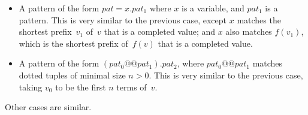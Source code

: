 \begin{itemize}
\item A pattern of the form $pat = x.pat_1$ where $x$ is a variable, and
  $pat_1$ is a pattern.  This is very similar to the previous case, except $x$
  matches the shortest prefix~$v_1$ of~$v$ that is a completed value; and $x$
  also matches $f(v_1)$, which is the shortest prefix of~$f(v)$ that is a
  completed value.

\item A pattern of the form $(pat_0 @@ pat_1).pat_2$, where $pat_0 @@ pat_1$
  matches dotted tuples of minimal size $n>0$.  This is very similar to the
  previous case, taking $v_0$ to be the first $n$ terms of~$v$.
\end{itemize}
Other cases are similar.
